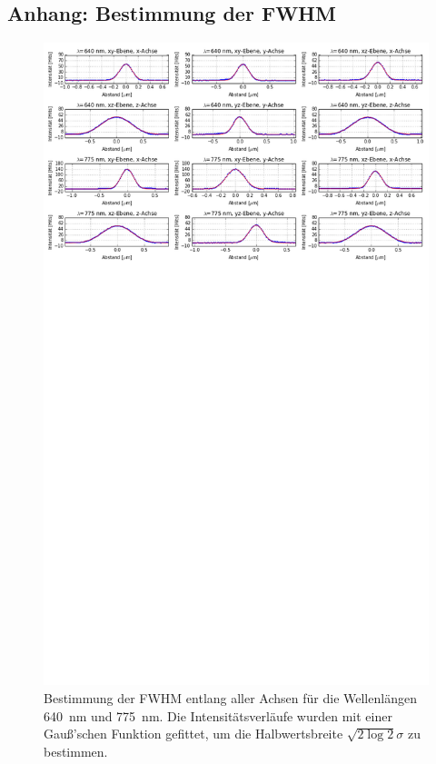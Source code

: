 \begin{appendix}
\section{Anhang: Bestimmung der FWHM}
\begin{figure}[h]
\centering
\includegraphics[trim= 0 950 0 0, width=\textwidth]{plots/goldbeads2.png}
\caption{Bestimmung der FWHM entlang aller Achsen für die Wellenlängen 640~nm und 775~nm. Die Intensitätsverläufe wurden mit einer Gauß'schen Funktion gefittet, um die Halbwertsbreite $\sqrt{2\log{2}}\sigma$ zu bestimmen.}\label{fig:gaussfits}
\end{figure}
\end{appendix}
